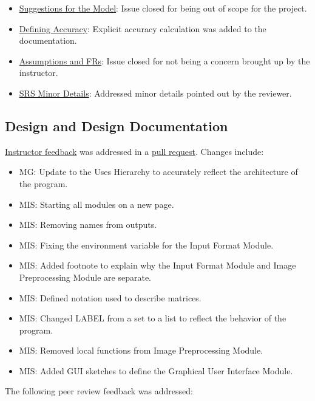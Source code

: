 \documentclass{article}
\begin{document}
\begin{itemize}
  \item \href{https://github.com/ptrandev/OCRacle/issues/8}{Suggestions for the Model}:
  Issue closed for being out of scope for the project.
  \item \href{https://github.com/ptrandev/OCRacle/issues/7}{Defining Accuracy}:
  Explicit accuracy calculation was added to the documentation.
  \item \href{https://github.com/ptrandev/OCRacle/issues/6}{Assumptions and FRs}:
  Issue closed for not being a concern brought up by the instructor.
  \item \href{https://github.com/ptrandev/OCRacle/issues/5}{SRS Minor Details}:
  Addressed minor details pointed out by the reviewer.
\end{itemize}


\subsection{Design and Design Documentation}

\href{https://github.com/ptrandev/OCRacle/issues/17}{Instructor feedback} was addressed in
a \href{https://github.com/ptrandev/OCRacle/pull/31}{pull request}. Changes include:

\begin{itemize}
  \item MG: Update to the Uses Hierarchy to accurately reflect the architecture of the program.
  \item MIS: Starting all modules on a new page.
  \item MIS: Removing names from outputs.
  \item MIS: Fixing the environment variable for the Input Format Module.
  \item MIS: Added footnote to explain why the Input Format Module and Image Preprocessing Module are separate.
  \item MIS: Defined notation used to describe matrices.
  \item MIS: Changed LABEL from a set to a list to reflect the behavior of the program.
  \item MIS: Removed local functions from Image Preprocessing Module.
  \item MIS: Added GUI sketches to define the Graphical User Interface Module.
\end{itemize}

\noindent The following peer review feedback was addressed:
\end{document}
